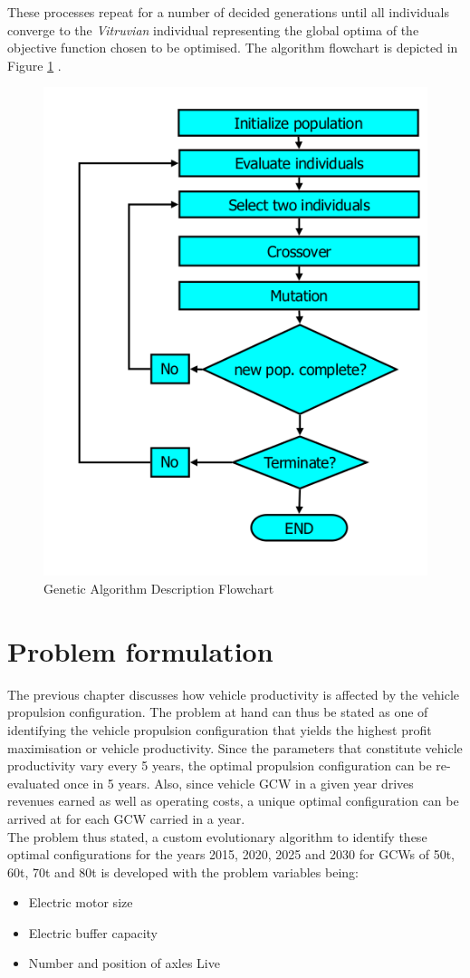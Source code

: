 \documentclass[ExampleMasters.tex]{subfiles}
\begin{document}
		These processes repeat for a number of decided generations until all individuals converge to the \textit{Vitruvian} individual representing the global optima of the objective function chosen to be optimised. The algorithm flowchart is depicted in Figure \ref{GAFlowchart} \cite{Wahde}.\\

		\begin{figure}[ht!]
			\centering
			\includegraphics[width=0.4\linewidth]{figures/GeneticAlgorithm/GAFlowchart.png}
			\caption{Genetic Algorithm Description Flowchart \cite{Wahde}}
			\label{GAFlowchart}
		\end{figure}

	\section{Problem formulation}
		The previous chapter discusses how vehicle productivity is affected by the vehicle propulsion configuration. The problem at hand can thus be stated as one of identifying the vehicle propulsion configuration that yields the highest profit maximisation or vehicle productivity. Since the parameters that constitute vehicle productivity vary every 5 years, the optimal propulsion configuration can be re-evaluated once in 5 years. Also, since vehicle GCW in a given year drives revenues earned as well as operating costs, a unique optimal configuration can be arrived at for each GCW carried in a year.\\ 

		The problem thus stated, a custom evolutionary algorithm to identify these optimal configurations for the years 2015, 2020, 2025 and 2030 for GCWs of 50t, 60t, 70t and 80t is developed with the problem variables being:
		\begin{itemize}
			\item Electric motor size
			\item Electric buffer capacity
			\item Number and position of axles Live
		\end{itemize}
\end{document}
